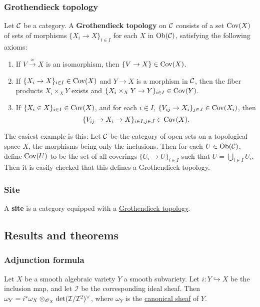 \documentclass[11pt, english]{article}
\begin{document}
\subsubsection{Grothendieck topology}
\label{grothendiecktopology}

Let $\mathcal{C}$ be a category. A \textbf{Grothendieck topology} on $\mathcal{C}$ consists of a set $\operatorname{Cov}(X)$ of sets of morphisms $\{ X_i \to X\}_{i \in I}$ for each $X$ in $\mathrm{Ob}(\mathcal{C})$, satisfying the following axioms:
\begin{enumerate}
\item If $V \xrightarrow{\approx} X$ is an isomorphism, then $\{ V \to X\} \in \operatorname{Cov}(X)$.
\item If $\{X_i \to X\}_{i \in I} \in \operatorname{Cov}(X)$ and $Y \to X$ is a morphism in $\mathcal{C}$, then the fiber products $X_i \times_X Y$ exists and ${\{ X_i \times_X Y \to Y\}_{i \in I} \in \operatorname{Cov}(Y)}$.
\item If $\{X_i \in X\}_{i \in I} \in \operatorname{Cov}(X)$, and for each $i \in I$, $\{ V_{ij} \to X_i\}_{j \in J} \in  \operatorname{Cov}(X_i)$, then
\[
\{ V_{ij} \to X_i \to X\}_{i \in I, j \in J} \in \operatorname{Cov}(X).
\]
\end{enumerate}

The easiest example is this: Let $\mathcal{C}$ be the category of open sets on a topological space $X$, the morphisms being only the inclusions. Then for each $U \in \mathrm{Ob}(\mathcal{C})$, define $\operatorname{Cov}(U)$ to be the set of all coverings $\{ U_i \to U \}_{i \in I}$ such that $U = \bigcup_{i\in I} U_i$. Then it is easily checked that this defines a Grothendieck topology.

\subsubsection{Site}
\label{site}

A \textbf{site} is a category equipped with a \hyperref[grothendiecktopology]{Grothendieck topology}.


\subsection{Results and theorems}
\subsubsection{Adjunction formula}
\label{adjunction}

Let $X$ be a smooth algebraic variety $Y$ a smooth subvariety. Let $i:Y \hookrightarrow X$ be the inclusion map, and let $\mathcal I$ be the corresponding ideal sheaf. Then $\omega_Y = i^\ast \omega_X \otimes_{\operatorname{\mathscr{O}}_X} \det(\mathcal I/\mathcal I^2)^\vee$, where $\omega_Y$ is the \hyperref[canonicalsheaf]{canonical sheaf} of $Y$.
\end{document}
